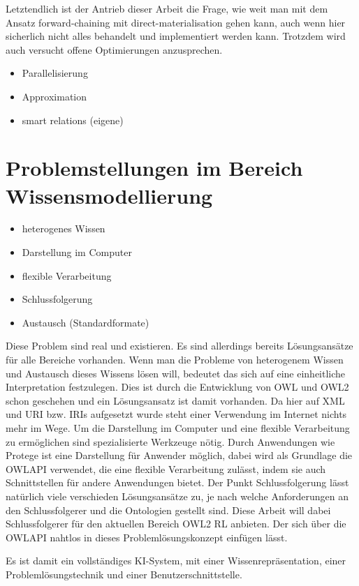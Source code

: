 Letztendlich ist der Antrieb dieser Arbeit die Frage, wie weit man mit dem Ansatz forward-chaining mit direct-materialisation gehen kann, auch wenn hier sicherlich nicht alles behandelt und implementiert werden kann. Trotzdem wird auch versucht offene Optimierungen anzusprechen.

\begin{itemize}
  \item Parallelisierung
  \item Approximation
  \item smart relations (eigene)
\end{itemize}

\section{Problemstellungen im Bereich Wissensmodellierung}

\begin{itemize}
  \item heterogenes Wissen
  \item Darstellung im Computer
  \item flexible Verarbeitung
  \item Schlussfolgerung
  \item Austausch (Standardformate)
\end{itemize}

Diese Problem sind real und existieren. Es sind allerdings bereits Lösungsansätze für alle Bereiche vorhanden. Wenn man die Probleme von heterogenem Wissen und Austausch dieses Wissens lösen will, bedeutet das sich auf eine einheitliche Interpretation festzulegen. Dies ist durch die Entwicklung von OWL und OWL2 schon geschehen und ein Lösungsansatz ist damit vorhanden. Da hier auf XML und URI bzw. IRIs aufgesetzt wurde steht einer Verwendung im Internet nichts mehr im Wege. Um die Darstellung im Computer und eine flexible Verarbeitung zu ermöglichen sind spezialisierte Werkzeuge nötig. Durch Anwendungen wie Protege ist eine Darstellung für Anwender möglich, dabei wird als Grundlage die OWLAPI verwendet, die eine flexible Verarbeitung zulässt, indem sie auch Schnittstellen für andere Anwendungen bietet. Der Punkt Schlussfolgerung lässt natürlich viele verschieden Lösungsansätze zu, je nach welche Anforderungen an den Schlussfolgerer und die Ontologien gestellt sind. Diese Arbeit will dabei Schlussfolgerer für den aktuellen Bereich OWL2 RL anbieten. Der sich über die OWLAPI nahtlos in dieses Problemlösungskonzept einfügen lässt.

Es ist damit ein vollständiges KI-System, mit einer Wissenrepräsentation, einer Problemlösungstechnik und einer Benutzerschnittstelle.

